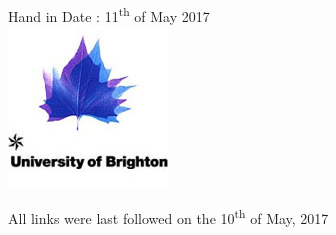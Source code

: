 \begin{titlepage}

{\large Hand in Date : 11\textsuperscript{th} of May 2017}\\[2cm] %


\includegraphics[scale=0.60]{Images/BrightonLogo.jpg}\\[1cm] %




\vfill %

\end{titlepage}

\tableofcontents
\pagebreak












\pagebreak
\printbibliography

All links were last followed on the 10\textsuperscript{th} of May, 2017


